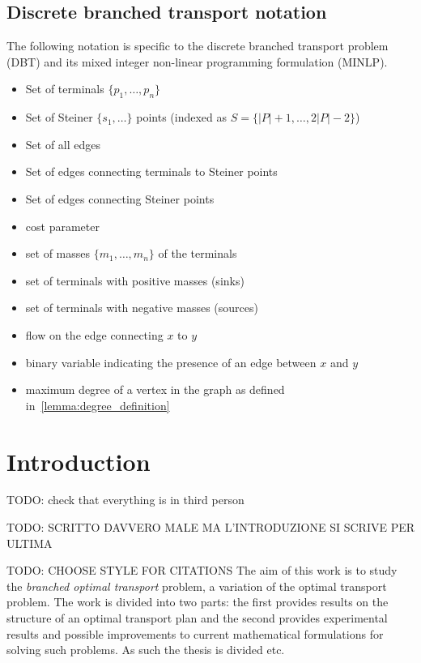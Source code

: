 \documentclass[12pt,a4paper]{article}
\newenvironment{itemizeb}
{\begin{itemize}
     \itemsep=2pt}{
\end{itemize}}
\numberwithin{equation}{section}
\theoremstyle{mytheorem}
\theoremstyle{myremark}
\theoremstyle{myparagraph}
\begin{document}
    \subsection*{Discrete branched transport notation}
    The following notation is specific to the discrete branched transport problem (DBT) and its mixed integer non-linear programming formulation (MINLP).
    \begin{itemizeb}
         cm=.3 cm
        \item [$P$] Set of terminals $\{p_1, \ldots, p_n\}$
        \item [$S$] Set of Steiner $\{s_1, \ldots\}$ points (indexed as $S = \{|P| + 1, \dots, 2|P|-2\}$)
        \item[$E$] Set of all edges
        \item [$E_1$] Set of edges connecting terminals to Steiner points
        \item [$E_2$] Set of edges connecting Steiner points

        \item[$\alpha \in {[0,1]}$] cost parameter
        \item [$M$] set of masses $\{m_1, \ldots, m_n\}$ of the terminals
        \item [$P^+$] set of terminals with positive masses (sinks)
        \item [$P^-$] set of terminals with negative masses (sources)
        \item [$f_{xy}$] flow on the edge connecting $x$ to $y$
        \item [$y_{xy}$] binary variable indicating the presence of an edge between $x$ and $y$
        \item [$\deg(\alpha, N, M)$] maximum degree of a vertex in the graph as defined in~\ref{lemma:degree_definition}
    \end{itemizeb}

    \newpage


    \section{Introduction}

    TODO: check that everything is in third person

    TODO: SCRITTO DAVVERO MALE MA L'INTRODUZIONE SI SCRIVE PER ULTIMA

    TODO: CHOOSE STYLE FOR CITATIONS
    The aim of this work is to study the \textit{branched optimal transport} problem, a variation of the optimal transport problem.
    The work is divided into two parts: the first provides results on the structure of an optimal transport plan and the second
    provides experimental results and possible improvements to current mathematical formulations for solving such problems.
    As such the thesis is divided etc.
\end{document}
